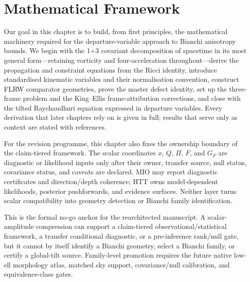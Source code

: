 
\chapter{Mathematical Framework}\label{ch:framework}

Our goal in this chapter is to build, from first principles, the
mathematical machinery required for the departure-variable approach
to Bianchi anisotropy bounds.  We begin with the 1+3 covariant
decomposition of spacetime in its most general form---retaining
vorticity and four-acceleration throughout---derive the
propagation and constraint equations from the Ricci identity,
introduce standardised kinematic variables and their
normalisation convention, construct FLRW comparator geometries,
prove the master defect identity, set up the three-frame problem
and the King--Ellis frame-attribution corrections, and close with
the tilted Raychaudhuri equation expressed in departure variables.
Every derivation that later chapters rely on is given in full;
results that serve only as context are stated with references.

For the revision programme, this chapter also fixes the ownership
boundary of the claim-tiered framework.  The scalar coordinates
$x$, $Q$, $\Pi$, $F$, and $G_F$ are diagnostic or likelihood inputs
only after their owner, transfer source, null status, covariance status,
and caveats are declared.  MIO may report diagnostic certificates and
direction/depth coherence; HTT owns model-dependent likelihoods,
posterior pushforwards, and evidence surfaces.  Neither layer turns
scalar compatibility into geometry detection or Bianchi family
identification.

This is the formal no-go anchor for the rearchitected
manuscript.  A scalar-amplitude compression can support a
claim-tiered observational/statistical framework, a transfer
conditional diagnostic, or a pre-inference rank/null gate, but it
cannot by itself identify a Bianchi geometry, select a Bianchi
family, or certify a global-tilt source.  Family-level promotion
requires the future native low-ell morphology atlas, matched sky
support, covariance/null calibration, and equivalence-class gates.


